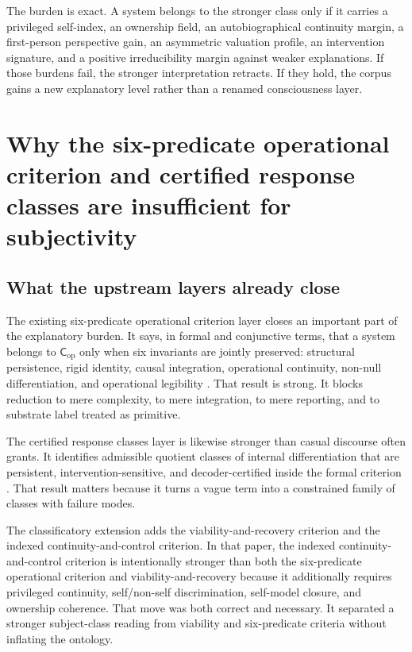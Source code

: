 \documentclass[11pt,a4paper]{article}
\theoremstyle{definition}
\newcommand{\Cop}{\mathsf{C}_{\mathrm{op}}}
\begin{document}
The burden is exact. A system belongs to the stronger class only if it carries a privileged self-index, an ownership field, an auto\-bio\-graphical continuity margin, a first-person perspective gain, an asymmetric valuation profile, an intervention signature, and a positive irreducibility margin against weaker explanations. If those burdens fail, the stronger interpretation retracts. If they hold, the corpus gains a new explanatory level rather than a renamed consciousness layer.

\section{Why the six-predicate operational criterion and certified response classes are insufficient for subjectivity}
\subsection{What the upstream layers already close}
The existing six-predicate operational criterion layer closes an important part of the explanatory burden. It says, in formal and conjunctive terms, that a system belongs to $\Cop$ only when six invariants are jointly preserved: structural persistence, rigid identity, causal integration, operational continuity, non-null differentiation, and operational legibility \cite{paper5}. That result is strong. It blocks reduction to mere complexity, to mere integration, to mere reporting, and to substrate label treated as primitive.

The certified response classes layer is likewise stronger than casual discourse often grants. It identifies admissible quotient classes of internal differentiation that are persistent, intervention-sensitive, and decoder-certified inside the formal criterion \cite{paper5}. That result matters because it turns a vague term into a constrained family of classes with failure modes.

The classificatory extension adds the viability-and-recovery criterion and the indexed continuity-and-control criterion. In that paper, the indexed continuity-and-control criterion is intentionally stronger than both the six-predicate operational criterion and viability-and-recovery because it additionally requires privileged continuity, self/non-self discrimination, self-model closure, and ownership coherence. That move was both correct and necessary. It separated a stronger subject-class reading from viability and six-predicate criteria without inflating the ontology.
\end{document}
